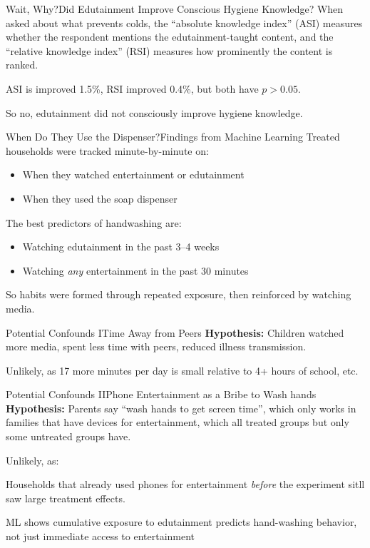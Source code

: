 \documentclass[aspectratio=169]{beamer}
\begin{document}
\begin{frame}{Wait, Why?}{Did Edutainment Improve Conscious Hygiene Knowledge?}
	When asked about what prevents colds, the ``absolute knowledge index''
	(ASI) measures whether the respondent mentions the edutainment-taught
	content, and the ``relative knowledge index'' (RSI) measures how
	prominently the content is ranked.

	ASI is improved 1.5\%, RSI improved 0.4\%, but both have $p > 0.05$.

	So no, edutainment did not consciously improve hygiene knowledge.
\end{frame}

\begin{frame}{When Do They Use the Dispenser?}{Findings from Machine Learning}
	Treated households were tracked minute-by-minute on:
	\begin{itemize}
		\item When they watched entertainment or edutainment
		\item When they used the soap dispenser
	\end{itemize}

	The best predictors of handwashing are:
	\begin{itemize}
		\item Watching edutainment in the past 3--4 weeks
		\item Watching \emph{any} entertainment in the past 30 minutes
	\end{itemize}

	So habits were formed through repeated exposure, then reinforced by watching media.
\end{frame}


\begin{frame}{Potential Confounds I}{Time Away from Peers}
	\textbf{Hypothesis:} Children watched more media, spent less time with
	peers, reduced illness transmission.

	Unlikely, as 17 more minutes per day is small relative to 4+ hours of
	school, etc.
\end{frame}

\begin{frame}{Potential Confounds II}{Phone Entertainment as a Bribe to Wash hands}
	\textbf{Hypothesis:} Parents say ``wash hands to get screen time'',
	which only works in families that have devices for entertainment, which
	all treated groups but only some untreated groups have.

	Unlikely, as:

	Households that already used phones for entertainment \emph{before} the
	experiment sitll saw large treatment effects.

	ML shows cumulative exposure to edutainment predicts hand-washing
	behavior, not just immediate access to entertainment
\end{frame}
\end{document}
